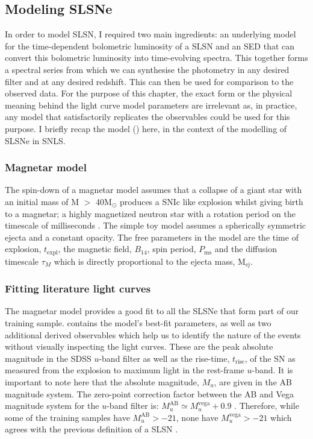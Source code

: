 \subsection{Modeling SLSNe}
In order to model SLSN, I required two main ingredients: an underlying model for the time-dependent bolometric luminosity of a SLSN and an SED that can convert this bolometric luminosity into time-evolving spectra. This together forms a spectral series from which we can synthesise the photometry in any desired filter and at any desired redshift. This can then be used for comparison to the observed data. For the purpose of this chapter, the exact form or the physical meaning behind the light curve model parameters are irrelevant as, in practice, any model that satisfactorily replicates the observables could be used for this purpose. I briefly recap the model () here, in the context of the modelling of SLSNe in SNLS.

\subsubsection{Magnetar model}
The spin-down of a magnetar model assumes that a collapse of a giant star with an initial mass of M $>$ 40M$_{\odot}$ produces a SNIc like explosion whilst giving birth to a magnetar; a highly magnetized neutron star with a rotation period on the timescale of milliseconds \citep{Kasen2009,Woosley2010,Inserra2013}. The simple toy model assumes a spherically symmetric ejecta and a constant opacity. The free parameters in the model are the time of explosion, $t_{\mathrm{expl}}$, the magnetic field, $B_{14}$, spin period, $P_{\mathrm{ms}}$ and the diffusion timescale $\tau_M$ which is directly proportional to the ejecta mass, M$_{\mathrm{ej}}$.

\subsubsection{Fitting literature light curves}
The magnetar model provides a good fit to all the SLSNe that form part of our training sample.  contains the model's best-fit parameters, as well as two additional derived observables which help us to identify the nature of the events without visually inspecting the light curves. These are the peak absolute magnitude in the SDSS $u$-band filter as well as the rise-time, $t_\mathrm{rise}$, of the SN as measured from the explosion to maximum light in the rest-frame $u$-band. It is important to note here that the absolute magnitude, $M_u$, are given in the AB magnitude system. The zero-point correction factor between the AB and Vega magnitude system for the $u$-band filter is: $M_u^{\mathrm{AB}}\simeq M_u^{\mathrm{vega}}+0.9$ \citep{Blanton2007}. Therefore, while some of the training samples have $M_u^{\mathrm{AB}}>-21$, none have $M_u^{\mathrm{vega}}>-21$ which agrees with the previous definition of a SLSN \citep{Gal-Yam2012}.

